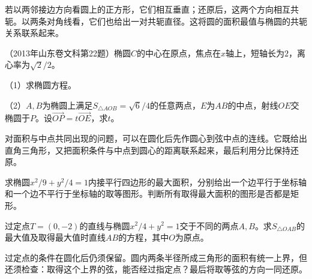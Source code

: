 若以两邻接边方向看圆上的正方形，它们相互垂直；还原后，这两个方向相互共轭。以两条对角线看，它们也给出一对共轭直径。这将圆的面积最值与椭圆的共轭关系联系起来。

\begin{samepage}
\noindent\begin{minipage}{\linewidth}
\begin{example}\label{ex:quadratic-affine-area-ratio}
（2013年山东卷文科第22题）椭圆\(C\)的中心在原点，焦点在\(x\)轴上，短轴长为\(2\)，离心率为\(\sqrt2/2\)。

\begin{samepage}
（1）求椭圆方程。
\par
\end{samepage}

\begin{samepage}
（2）\(A,B\)为椭圆上满足\(S_{\triangle AOB}=\sqrt6/4\)的任意两点，\(E\)为\(AB\)的中点，射线\(OE\)交椭圆于\(P\)。设\(\overrightarrow{OP}=t\overrightarrow{OE}\)，求\(t\)。
\par
\end{samepage}
\end{example}
\end{minipage}
\end{samepage}

\begin{samepage}
对面积与中点共同出现的问题，可以在圆化后先作圆心到弦中点的连线。它既给出直角三角形，又把面积条件与中点到圆心的距离联系起来，最后利用分比保持还原。
\par
\end{samepage}

\begin{samepage}
\begin{example}
求椭圆\(x^2/9+y^2/4=1\)内接平行四边形的最大面积，分别给出一个边平行于坐标轴和一个边不平行于坐标轴的取等图形。判断所有取得最大面积的图形是否都是矩形。
\end{example}
\end{samepage}

\begin{samepage}
\begin{example}\label{ex:quadratic-affine-fixed-point-area}
过定点\(T=(0,-2)\)的直线与椭圆\(x^2/4+y^2=1\)交于不同的两点\(A,B\)。求\(S_{\triangle OAB}\)的最大值及取得最大值时直线\(AB\)的方程，其中\(O\)为原点。
\end{example}
\end{samepage}

过定点的条件在圆化后仍须保留。圆内两条半径所成三角形的面积有统一上界，但还须检查：取得这个上界的弦，能否经过指定点？最后将取等弦的方向一同还原。

